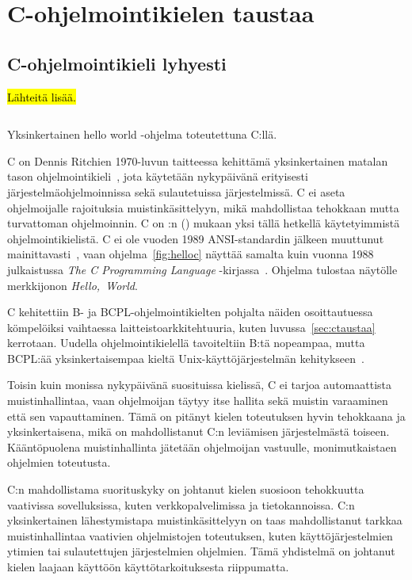 \section{C-ohjelmointikielen taustaa}

\subsection{C-ohjelmointikieli lyhyesti}
\label{sec:clyhyesti}

\hl{Lähteitä lisää.}

\begin{listing}[ht!]
    \inputminted{C}{koodi/hello.c}
    \caption{Yksinkertainen hello world -ohjelma toteutettuna C:llä.}
    \label{fig:helloc}
\end{listing}

C on Dennis Ritchien 1970-luvun taitteessa kehittämä yksinkertainen matalan
tason ohjelmointikieli~\citep{chistory}, jota käytetään nykypäivänä erityisesti
järjestelmäohjelmoinnissa sekä sulautetuissa järjestelmissä. C ei aseta
ohjelmoijalle rajoituksia muistinkäsittelyyn, mikä mahdollistaa tehokkaan mutta
turvattoman ohjelmoinnin. C on \citeauthor{tiobe}:n (\citeyear{tiobe}) mukaan
yksi tällä hetkellä käytetyimmistä ohjelmointikielistä. C ei ole vuoden 1989
ANSI-standardin jälkeen muuttunut mainittavasti~\citep{chistory, C18}, vaan
ohjelma~\ref{fig:helloc} näyttää samalta kuin vuonna 1988 julkaistussa
\emph{The C Programming Language} -kirjassa~\citep{krsecond}. Ohjelma tulostaa
näytölle merkkijonon \emph{Hello,~World}.

C kehitettiin B- ja BCPL-ohjelmointikielten pohjalta näiden osoittautuessa
kömpelöiksi vaihtaessa laitteistoarkkitehtuuria, kuten
luvussa~\ref{sec:ctaustaa} kerrotaan. Uudella ohjelmointikielellä tavoiteltiin
B:tä nopeampaa, mutta BCPL:ää yksinkertaisempaa kieltä Unix-käyttöjärjestelmän
kehitykseen~\citep{chistory}.

Toisin kuin monissa nykypäivänä suosituissa kielissä, C ei tarjoa automaattista
muistinhallintaa, vaan ohjelmoijan täytyy itse hallita sekä muistin varaaminen
että sen vapauttaminen. Tämä on pitänyt kielen toteutuksen hyvin tehokkaana ja
yksinkertaisena, mikä on mahdollistanut C:n leviämisen järjestelmästä toiseen.
Kääntöpuolena muistinhallinta jätetään ohjelmoijan vastuulle, monimutkaistaen
ohjelmien toteutusta.

C:n mahdollistama suorituskyky on johtanut kielen suosioon tehokkuutta
vaativissa sovelluksissa, kuten verkkopalvelimissa ja tietokannoissa. C:n
yksinkertainen lähestymistapa muistinkäsittelyyn on taas mahdollistanut tarkkaa
muistinhallintaa vaativien ohjelmistojen toteutuksen, kuten käyttöjärjestelmien
ytimien tai sulautettujen järjestelmien ohjelmien. Tämä yhdistelmä on johtanut
kielen laajaan käyttöön käyttötarkoituksesta riippumatta.

